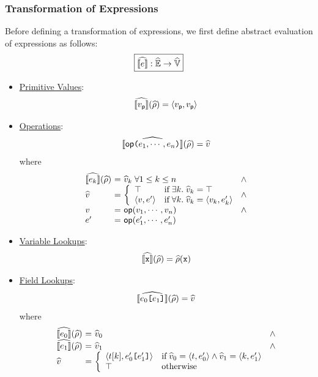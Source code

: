 \subsubsection{Transformation of Expressions} Before defining a transformation of
expressions, we first define abstract evaluation of expressions as follows:
\[
  \framebox{$\asem{\expr}: \aenvset \rightarrow \avalset$}
\]
\begin{itemize}
  \item \underline{Primitive Values}:
    \[
      \widehat{\llbracket{v_{\textsf{p}}}\rrbracket}(\widehat{\rho}) = \langle v_{\textsf{p}}, v_{\textsf{p}} \rangle
    \]
  \item \underline{Operations}:
    \[
      \widehat{\llbracket{\textsf{op}\texttt{(}e_1, \cdots, e_n \texttt{)}}\rrbracket}(\widehat{\rho}) = \widehat{v}
    \]
    where
    \[
      \begin{array}{l@{~}c@{~}l@{~}l}
        \asem{\expr_k}(\aenv) &=& \aval_k \; \forall 1 \leq k \leq n
        &\wedge\\
        \aval &=& \left\{
          \begin{array}{ll}
            \top & \text{if} \; \exists k. \; \aval_k = \top\\
            \langle \val, \expr' \rangle & \text{if} \; \forall k. \; \aval_k =
            \langle \val_k, \expr'_k \rangle\\
          \end{array}
        \right. &\wedge\\
        \val &=& \op(\val_1, \cdots, \val_n) &\wedge\\
        \expr' &=& \op(\expr'_1, \cdots, \expr'_n)\\
      \end{array}
    \]
  \item \underline{Variable Lookups}:
    \[
      \widehat{\llbracket{\texttt{x}}\rrbracket}(\widehat{\rho}) = \widehat{\rho}(\texttt{x})
    \]
  \item \underline{Field Lookups}:
    \[
      \widehat{\llbracket{e_0 \texttt{[}e_1 \texttt{]}}\rrbracket}(\widehat{\rho}) = \widehat{v}
    \]
    where
    \[
      \begin{array}{l@{~}c@{~}l@{~}l}
        \asem{\expr_0}(\aenv) &=& \aval_0 &\wedge\\
        \asem{\expr_1}(\aenv) &=& \aval_1 &\wedge\\
        \aval &=& \left\{
          \begin{array}{ll}
            \langle \tree[k], \expr'_0 \kwsl \expr'_1 \kwsr \rangle & \text{if}
            \; \aval_0 = \langle \tree, \expr'_0 \rangle \wedge \aval_1 =
            \langle k, \expr'_1 \rangle\\
            \top & \text{otherwise}\\
          \end{array}
        \right.\\
      \end{array}
    \]
\end{itemize}
